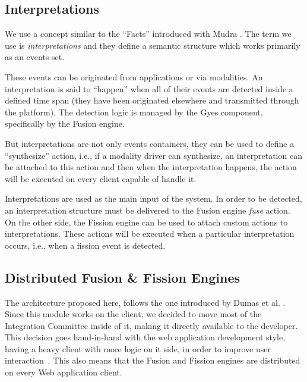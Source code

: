 \documentclass{llncs}
\begin{document}
\subsection{Interpretations}
We use a concept similar to the ``Facts'' introduced with Mudra \cite{Hoste2011}. The term we use is \emph{interpretations} and they define a semantic structure which works primarily as an events set.
 
These events can be originated from applications or via modalities. An interpretation is said to ``happen'' when all of their events are detected inside a defined time span (they have been originated elsewhere and transmitted through the platform). The detection logic is managed by the Gyes component, specifically by the Fusion engine.
 
But interpretations are not only events containers, they can be used to define a ``synthesize'' action, i.e., if a modality driver can synthesize, an interpretation can be attached to this action and then when the interpretation happens, the action will be executed on every client capable of handle it.

Interpretations are used as the main input of the system. In order to be detected, an interpretation structure must be delivered to the Fusion engine \emph{fuse} action.
On the other side, the Fission engine can be used to attach custom actions to interpretations. These actions will be executed when a particular interpretation occurs, i.e., when a fission event is detected.
\subsection{Distributed Fusion \& Fission Engines}
The architecture proposed here, follows the one introduced by Dumas et al. \cite{Dumas2009}. Since this module works on the client, we decided to move most of the Integration Committee inside of it, making it directly available to the developer. This decision goes hand-in-hand with the web application development style, having a heavy client with more logic on it side, in order to improve user interaction~\cite{Fraternali2010a}. This also means that the Fusion and Fission engines are distributed on every Web application client.
\end{document}
